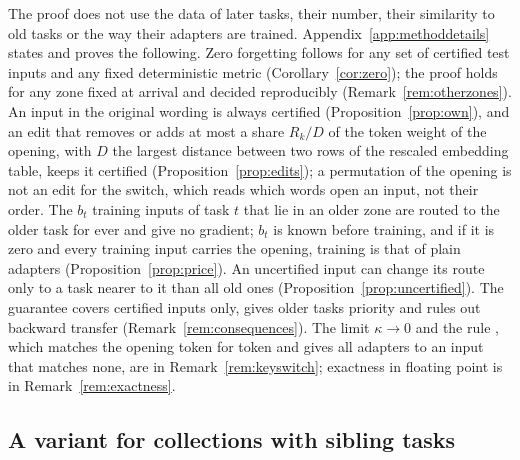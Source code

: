 The proof does not use the data of later tasks, their number, their similarity to old tasks or the
way their adapters are trained. Appendix~\ref{app:methoddetails} states and proves the following.
Zero forgetting follows for any set of certified test inputs and any fixed deterministic metric
(Corollary~\ref{cor:zero}); the proof holds for any zone fixed at arrival and decided reproducibly
(Remark~\ref{rem:otherzones}). An input in the original wording is always certified
(Proposition~\ref{prop:own}), and an edit that removes or adds at most a share $R_k/D$ of the token
weight of the opening, with $D$ the largest distance between two rows of the rescaled embedding
table, keeps it certified (Proposition~\ref{prop:edits}); a permutation of the opening is not an
edit for the switch, which reads which words open an input, not their order. The $b_t$ training
inputs of task $t$ that lie in an older zone are routed to the older task for ever and give no
gradient; $b_t$ is known before training, and if it is zero and every training input carries the opening, training is that of plain adapters
(Proposition~\ref{prop:price}). An uncertified input can change its route only to a task nearer to
it than all old ones (Proposition~\ref{prop:uncertified}). The guarantee covers certified inputs
only, gives older tasks priority and rules out backward transfer (Remark~\ref{rem:consequences}).
The limit $\kappa \to 0$ and the rule \keyswitch{}, which matches the opening token for token and
gives all adapters to an input that matches none, are in Remark~\ref{rem:keyswitch}; exactness in
floating point is in Remark~\ref{rem:exactness}.

\subsection{A variant for collections with sibling tasks}
\label{sec:exactfirst}

